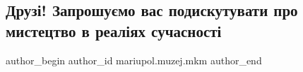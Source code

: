  
 
 
 
 

\subsection{Друзі! Запрошуємо вас подискутувати про мистецтво в реаліях сучасності}
\label{sec:23_08_2023.fb.mariupol.muzej.mkm.1.diskussia_mystectvo_hudozhnyk_anatolij_kravchenko}

\ifcmt
 author_begin
   author_id mariupol.muzej.mkm
 author_end
\fi
